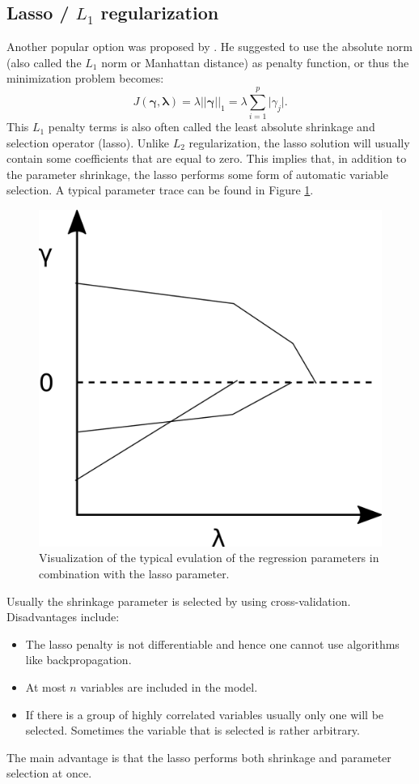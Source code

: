 \subsection{Lasso / $L_1$ regularization}
\label{sec:Lasso}
Another popular option was proposed by \cite{tibshirani_regression_1996}. He suggested to use the absolute norm (also called the $L_1$ norm or Manhattan distance) as penalty function, or thus the minimization problem becomes: \[J(\bm{\gamma},\bm{\lambda}) = \lambda \vert \vert \bm{\gamma} \vert \vert _1 = \lambda \sum_{i=1}^p \vert \gamma_j \vert.\]
This $L_1$ penalty terms is also often called the least absolute shrinkage and selection operator (lasso). Unlike $L_2$ regularization, the lasso solution will usually contain some coefficients that are equal to zero. This implies that, in addition to the parameter shrinkage, the lasso performs some form of automatic variable selection. A typical parameter trace can be found in Figure \ref{fig:LassoTrace}. \\
\begin{figure}[!htb]
\centering
\includegraphics[scale=0.75]{VectorGraphics/lassoTrace.png}
\caption{\label{fig:LassoTrace}Visualization of the typical evulation of the regression parameters in combination with the lasso parameter.}
\end{figure}

Usually the shrinkage parameter is selected by using cross-validation. Disadvantages include:
\begin{itemize}
\item The lasso penalty is not differentiable and hence one cannot use algorithms like backpropagation.
\item At most $n$ variables are included in the model.
\item If there is a group of highly correlated variables usually only one will be selected. Sometimes the variable that is selected is rather arbitrary.
\end{itemize}
The main advantage is that the lasso performs both shrinkage and parameter selection at once.


